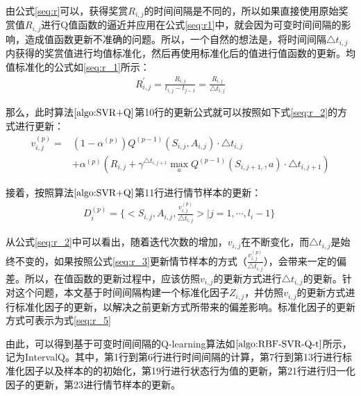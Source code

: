 由公式\eqref{seq:r}可以，获得奖赏$R_{i,j}$的时间间隔是不同的，所以如果直接使用原始奖赏值$R_{i,j}$进行Q值函数的逼近并应用在公式\eqref{seq:r1}中，就会因为可变时间间隔的影响，造成值函数更新不准确的问题。所以，一个自然的想法是，将时间间隔$\triangle t_{i,j}$内获得的奖赏值进行均值标准化，然后再使用标准化后的值进行值函数的更新。均值标准化的公式如\eqref{seq:r_1}所示：
\begin{equation}\label{seq:r_1}
\begin{aligned}
R_{i, j}^{'}=\frac{R_{i,j}}{t_{i,j}-t_{j-1}}=\frac{R_{i,j}}{\triangle t_{i,j}}
\end{aligned}
\end{equation}

那么，此时算法$\ref{algo:SVR+Q}$第10行的更新公式就可以按照如下式\eqref{seq:r_2}的方式进行更新：
\begin{equation}\label{seq:r_2}
\begin{aligned}
v_{i,j}^{(p)}=&(1-\alpha^{(p)})Q^{(p-1)}(S_{i,j},A_{i,j}) \cdot \triangle t_{i,j} \\
&+ \alpha^{(p)} (R_{i,j} + \gamma^{\triangle t_{i,j+1}} \max_{a} Q^{(p-1)}(S_{i,j+1,},a) \cdot \triangle t_{i,j+1})
\end{aligned}
\end{equation}

接着，按照算法$\ref{algo:SVR+Q}$第11行进行情节样本的更新：
\begin{equation}\label{seq:r_3}
\begin{aligned}
D_{i}^{(p)}=\{<S_{i,j}, A_{i,j}, \frac{v_{i,j}^{(p)}}{\triangle t_{i,j}}>|j=1,\cdots,l_{i}-1\}\;
\end{aligned}
\end{equation}

从公式\eqref{seq:r_2}中可以看出，随着迭代次数的增加，$v_{i,j}$在不断变化，而$\triangle t_{i,j}$是始终不变的，如果按照公式\eqref{seq:r_3}更新情节样本的方式（$\frac{v_{i,j}^{(p)}}{\triangle t_{i,j}}$），会带来一定的偏差。所以，在值函数的更新过程中，应该仿照$v_{i,j}$的更新方式进行$\triangle t_{i,j}$的更新。针对这个问题，本文基于时间间隔构建一个标准化因子$Z_{i,j}$，并仿照$v_{i,j}$的更新方式进行标准化因子的更新，以解决之前更新方式所带来的偏差影响。标准化因子的更新方式可表示为式\eqref{seq:r_5}


由此，可以得到基于可变时间间隔的Q-learning算法如$\ref{algo:RBF-SVR-Q-t}$所示，记为IntervalQ。其中，第1行到第6行进行时间间隔的计算，第7行到第13行进行标准化因子以及样本的的初始化，第19行进行状态行为值的更新，第21行进行归一化因子的更新，第23进行情节样本的更新。

